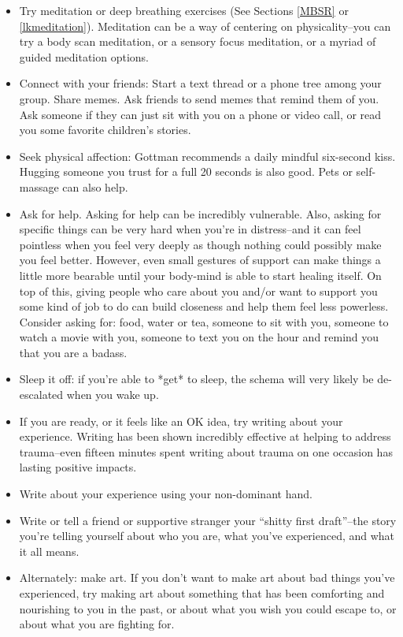 \documentclass[12pt,letterpaper]{book}
\begin{document}
\begin{itemize}
    \item Try meditation or deep breathing exercises (See Sections \ref{MBSR} or \ref{lkmeditation}). Meditation can be a way of centering on physicality--you can try a body scan meditation, or a sensory focus meditation, or a myriad of guided meditation options.
    \item Connect with your friends: Start a text thread or a phone tree among your group. Share memes. Ask friends to send memes that remind them of you. Ask someone if they can just sit with you on a phone or video call, or read you some favorite children's stories.
    \item Seek physical affection: Gottman recommends a daily mindful six-second kiss. Hugging someone you trust for a full 20 seconds is also good. Pets or self-massage can also help.
    \item Ask for help. Asking for help can be incredibly vulnerable. Also, asking for specific things can be very hard when you're in distress--and it can feel pointless when you feel very deeply as though nothing could possibly make you feel better. However, even small gestures of support can make things a little more bearable until your body-mind is able to start healing itself. On top of this, giving people who care about you and/or want to support you some kind of job to do can build closeness and help them feel less powerless. Consider asking for: food, water or tea, someone to sit with you, someone to watch a movie with you, someone to text you on the hour and remind you that you are a badass.
    \item Sleep it off: if you're able to *get* to sleep, the schema will very likely be de-escalated when you wake up.
    \item If you are ready, or it feels like an OK idea, try writing about your experience. Writing has been shown incredibly effective at helping to address trauma--even fifteen minutes spent writing about trauma on one occasion has lasting positive impacts.
    \item Write about your experience using your non-dominant hand.
    \item Write or tell a friend or supportive stranger your “shitty first draft”--the story you're telling yourself about who you are, what you've experienced, and what it all means.
    \item Alternately: make art. If you don't want to make art about bad things you've experienced, try making art about something that has been comforting and nourishing to you in the past, or about what you wish you could escape to, or about what you are fighting for.

\end{itemize}
\end{document}
